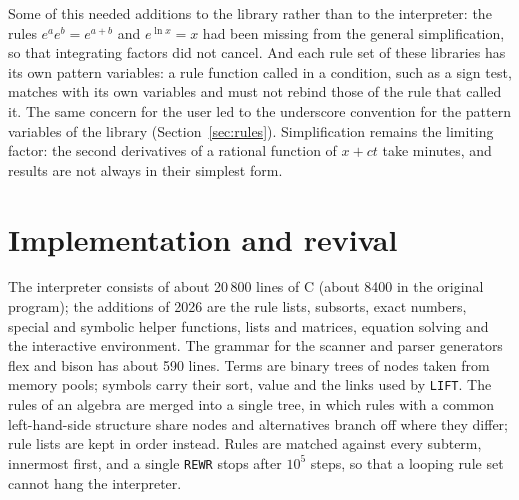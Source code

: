 \documentclass[11pt,a4paper]{article}
\begin{document}
Some of this needed additions to the library rather than to the
interpreter: the rules $e^ae^b=e^{a+b}$ and $e^{\ln x}=x$ had been missing
from the general simplification, so that integrating factors did not
cancel. And each rule set of these libraries has its own pattern
variables: a rule function called in a condition, such as a sign test,
matches with its own variables and must not rebind those of the rule that
called it. The same concern for the user led to the underscore convention
for the pattern variables of the library (Section~\ref{sec:rules}).
Simplification remains the limiting factor: the second derivatives of a
rational function of $x+ct$ take minutes, and results are not always in
their simplest form.

\section{Implementation and revival}

The interpreter consists of about 20\,800 lines of C (about 8400 in the
original program); the additions of 2026 are the rule lists, subsorts,
exact numbers, special and symbolic helper functions, lists and matrices,
equation solving and the interactive environment. The grammar for the
scanner and parser generators flex and bison has about 590 lines. Terms are binary trees of nodes taken
from memory pools; symbols carry their sort, value and the links used by
\texttt{LIFT}. The rules of an algebra are merged into a single tree, in
which rules with a common left-hand-side structure share nodes and
alternatives branch off where they differ; rule lists are kept in order
instead. Rules are matched against every subterm, innermost first, and a
single \texttt{REWR} stops after $10^5$ steps, so that a looping rule set
cannot hang the interpreter.
\end{document}
